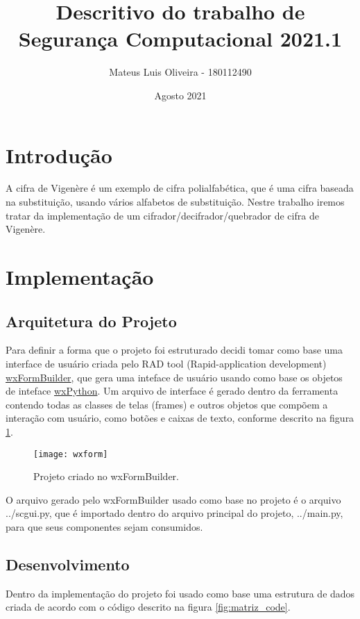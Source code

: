 \documentclass[10pt]{article}
\title{Descritivo do trabalho de Segurança Computacional 2021.1}
\author{Mateus Luis Oliveira - 180112490}
\date{Agosto 2021}
\begin{document}
\maketitle

\section{Introdução}
A cifra de Vigenère é um exemplo de cifra polialfabética, que é uma cifra baseada 
na substituição, usando vários alfabetos de substituição. Nestre trabalho iremos tratar da implementação de um cifrador/decifrador/quebrador 
de cifra de Vigenère.



\section{Implementação}

\subsection{Arquitetura do Projeto}
Para definir a forma que o projeto foi estruturado decidi tomar como base uma interface de usuário criada pelo RAD tool (Rapid-application development) 
\href{https://github.com/wxFormBuilder/wxFormBuilder}{wxFormBuilder}, que gera uma inteface de usuário usando como base os objetos de inteface
\href{https://www.wxpython.org/}{wxPython}. Um arquivo de interface é gerado dentro da ferramenta contendo todas as classes de telas (frames) e 
outros objetos que compõem a interação com usuário, como botões e caixas de texto, conforme descrito na figura \ref{fig:wxform}.

\begin{figure}[h]
  \texttt{[image: wxform]}
  \centering
  \caption{Projeto criado no wxFormBuilder.}
  \label{fig:wxform}
\end{figure}
O arquivo gerado pelo wxFormBuilder usado como base no projeto é o arquivo ../scgui.py, que é importado dentro do arquivo principal do projeto,
../main.py, para que seus componentes sejam consumidos.

\subsection{Desenvolvimento}


Dentro da implementação do projeto foi usado como base uma estrutura de dados
criada de acordo com o código descrito na figura \ref{fig:matriz_code}.
\end{document}

